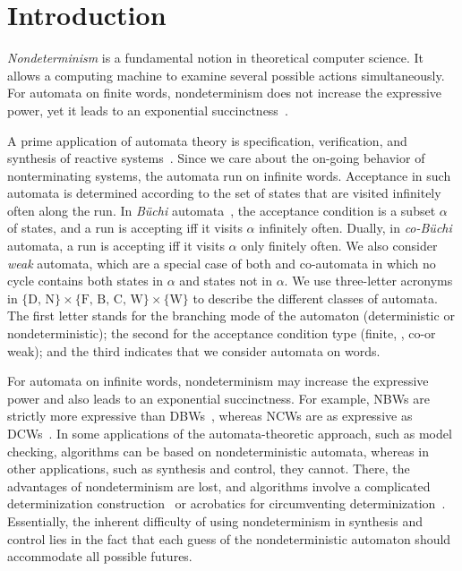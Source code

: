\documentclass{lmcs}
\begin{document}
\section{Introduction}
\label{intro}
{\em Nondeterminism\/} is a fundamental notion in theoretical computer science. It allows a computing machine to examine several possible actions simultaneously. 
For automata on finite words, nondeterminism does not increase the expressive power, yet it leads to an exponential succinctness~\cite{RS59}. 

A prime application of automata theory is specification, verification, and synthesis of reactive systems~\cite{VW94,Kup18}.  Since we care about the on-going behavior of nonterminating  systems, the automata run on infinite words. Acceptance in such automata is determined according to the set of states that are visited infinitely often along the run. In {\em B\"uchi\/} automata~\cite{Buc62},
the acceptance condition is a subset $\alpha$ of states, and a run is accepting iff it visits $\alpha$ infinitely often. Dually, in {\em co-B\"uchi\/} automata, 
a run is accepting iff it visits $\alpha$ only finitely often. We also consider {\em weak\/} automata, which are a special case of both \buchi and co-\buchi automata in which no cycle contains both states in $\alpha$ and states not in $\alpha$. We use three-letter acronyms in $\{ \text{D, N} \} \times \{ \text{F, B, C, W}\} \times \{\text{W}\}$ to describe the different classes of automata. The first letter stands for the branching mode of the automaton (deterministic or nondeterministic); the second for the acceptance condition type (finite, \buchi, co-\buchi or weak); and the third indicates that we consider automata on words. 


For automata on infinite words, nondeterminism may increase the expressive power and also leads to an exponential succinctness. For example, NBWs are strictly more expressive than DBWs~\cite{Lan69}, whereas NCWs are as expressive as DCWs~\cite{MH84}. In some applications of the automata-theoretic approach, such as model checking, algorithms can be based on nondeterministic automata, whereas in other applications, such as synthesis and control, they cannot. There, the advantages of nondeterminism are lost, and algorithms involve a complicated determinization construction~\cite{Saf88} or acrobatics for circumventing determinization~\cite{KV05c}.
Essentially, the inherent difficulty of using nondeterminism in synthesis and control lies in the fact that each guess of the nondeterministic automaton should accommodate all possible futures. 
\end{document}
